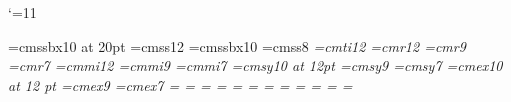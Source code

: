 %
%
%
%
%
%
%
%
%

\catcode`\@=11


\parindent0pt		%
\parskip0pt		%

\def\StandardAspect{%
\pdfpagewidth=120mm	%
\pdfpageheight=90mm	%
\vsize=67mm		%
\hsize=110mm		%
\hoffset=-20.4mm	%
\voffset=-12.4mm	%
}

\def\WideAspect{%
\pdfpagewidth=144mm	%
\pdfpageheight=90mm	%
\vsize=67mm		%
\hsize=134mm		%
\hoffset=-20.4mm	%
\voffset=-12.4mm	%
}


%
%
\font\titlefont=cmssbx10 at 20pt %
\font\normalfont=cmss12          %
\font\slidetitlefont=cmssbx10    %
\font\linkbarfont=cmss8          %
\font\it=cmti12
%
\baselineskip=15pt
\font\tfont=cmr12
\font\sfont=cmr9
\font\ssfont=cmr7
\font\tifont=cmmi12
\font\sifont=cmmi9
\font\ssifont=cmmi7
\font\tsyfont=cmsy10 at 12pt
\font\ssyfont=cmsy9
\font\sssyfont=cmsy7
\font\texfont=cmex10 at 12 pt
\font\sexfont=cmex9
\font\ssexfont=cmex7
%
=\tfont
{}=\sfont
{}=\ssfont
{}=\tifont
{}=\sifont
{}=\ssifont
{}=\tsyfont
{}=\ssyfont
{}=\sssyfont
{}=\texfont
{}=\sexfont
{}=\ssexfont
%

